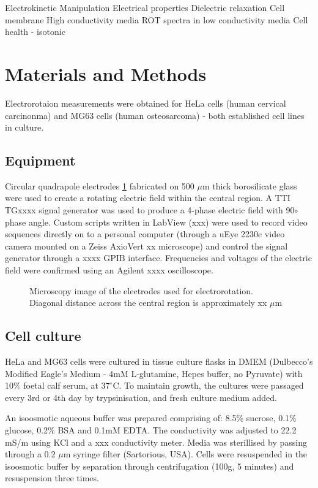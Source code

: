 Electrokinetic Manipulation
Electrical properties
Dielectric relaxation
Cell membrane
High conductivity media
ROT spectra in low conductivity media
Cell health - isotonic

\section{Materials and Methods}
Electrorotaion measurements were obtained for HeLa cells (human cervical carcinonma) and MG63 cells (human osteosarcoma) - both established cell lines in culture.


\subsection{Equipment}
Circular quadrapole electrodes \ref{fig:ROT_electrodes} fabricated on 500 $\mu$m thick borosilicate glass were used to create a rotating electric field within the central region. A TTI TGxxxx signal generator was used to produce a 4-phase electric field with 90$\circ$ phase angle. Custom scripts written in LabView (xxx) were used to record video sequences directly on to a personal computer (through a uEye 2230c video camera mounted on a Zeiss AxioVert xx microscope) and control the signal generator through a xxxx GPIB interface. Frequencies and voltages of the electric field were confirmed using an Agilent xxxx oscilloscope.

\begin{figure}
	\centering
	\caption{Microscopy image of the electrodes used for electrorotation. Diagonal distance across the central region is approximately xx $\mu$m}
	\label{fig:ROT_electrodes}
\end{figure}

\subsection{Cell culture}

HeLa and MG63 cells were cultured in tissue culture flasks in DMEM (Dulbecco's Modified Eagle's Medium - 4mM L-glutamine, Hepes buffer, no Pyruvate) with 10$\%$ foetal calf serum, at $37^{\circ}$C. To maintain growth, the cultures were passaged every 3rd or 4th day by trypsinisation, and fresh culture medium added.

An isoosmotic aqueous buffer was prepared comprising of: 8.5\% sucrose, 0.1\% glucose, 0.2\% BSA and 0.1mM EDTA. The conductivity was adjusted to 22.2 mS/m using KCl and a xxx conductivity meter. Media was sterillised by passing through a 0.2 $\mu$m syringe filter (Sartorious, USA). Cells were resuspended in the isoosmotic buffer by separation through centrifugation (100g, 5 minutes) and resuspension three times.

